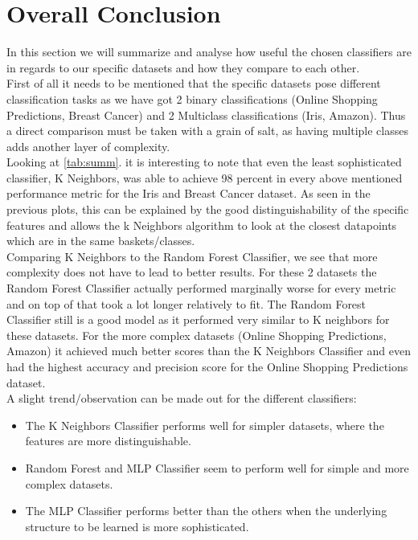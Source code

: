 \documentclass{article}
\newcommand{\secref}[1]{\autoref{#1}. \textit{\nameref{#1}}}
\begin{document}
\section{Overall Conclusion}
In this section we will summarize and analyse how useful the chosen classifiers are in regards to our specific datasets and how they compare to each other. \\
\newline
First of all it needs to be mentioned that the specific datasets pose different classification tasks as we have got 2 binary classifications (Online Shopping Predictions, Breast Cancer) and 2 Multiclass classifications (Iris, Amazon). Thus a direct comparison must be taken with a grain of salt, as having multiple classes adds another layer of complexity. \\
\newline
Looking at \secref{tab:summ} it is interesting to note that even the least sophisticated classifier, K Neighbors, was able to achieve 98 percent in every above mentioned performance metric for the Iris and Breast Cancer dataset. As seen in the previous plots, this can be explained by the good distinguishability of the specific features and allows the k Neighbors algorithm to look at the closest datapoints which are in the same baskets/classes. \\
Comparing K Neighbors  to the Random Forest Classifier, we see that more complexity does not have to lead to better results. For these 2 datasets the Random Forest Classifier actually performed marginally worse for every metric and on top of that took a lot longer relatively to fit. The Random Forest Classifier still is a good model as it performed very similar to K neighbors for these datasets. For the more complex datasets (Online Shopping Predictions, Amazon) it achieved much better scores than the K Neighbors Classifier and even had the highest accuracy and precision score for the Online Shopping Predictions dataset. \\
\newline
A slight trend/observation can be made out for the different classifiers: 
\begin{itemize}
    \item The K Neighbors Classifier performs well for simpler datasets, where the features are more distinguishable.
    \item Random Forest and MLP Classifier seem to perform well for simple and more complex datasets.
    \item The MLP Classifier performs better than the others when the underlying structure to be learned is more sophisticated.
\end{itemize} 
\end{document}

